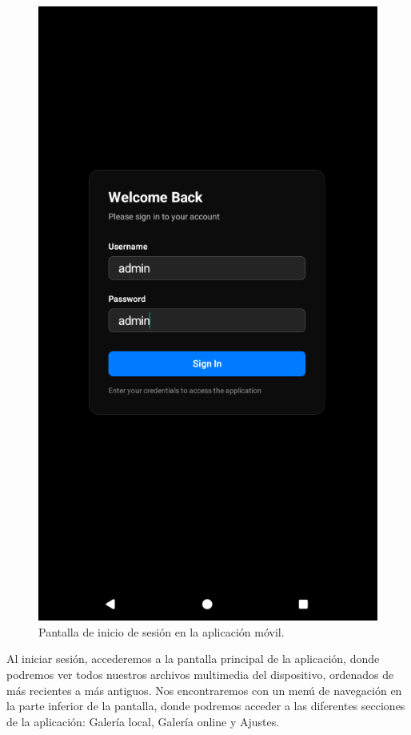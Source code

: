 \begin{figure}[h]
\begin{minipage}[t]{0.3\textwidth}
    \includegraphics[width=\textwidth]{assets/login-screen-mobile.png}
    \caption{Pantalla de inicio de sesión en la aplicación móvil.}
    \label{fig:login-screen-mobile}
  \end{minipage}
\end{figure}

Al iniciar sesión, accederemos a la pantalla principal de la aplicación, donde podremos ver todos nuestros archivos multimedia del dispositivo, ordenados de más recientes a más antiguos.
Nos encontraremos con un menú de navegación en la parte inferior de la pantalla, donde podremos acceder a las diferentes secciones de la aplicación: Galería local, Galería online y Ajustes.

